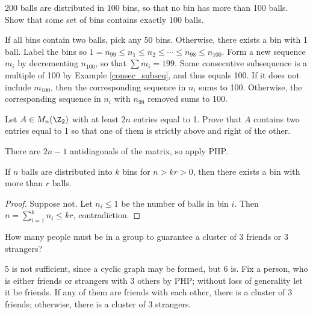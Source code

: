 \documentclass[a4paper]{article}
\begin{document}
\begin{example}
200 balls are distributed in 100 bins, so that no bin has more than 100 balls. Show that some set of bins contains exactly 100 balls.

\begin{hl}
If all bins contain two balls, pick any 50 bins. Otherwise, there exists a bin with 1 ball. Label the bins so $1=n_{99}\leq n_1\leq n_2\leq\cdots\leq n_{98}\leq n_{100}$. Form a new sequence $m_i$ by decrementing $n_{100}$, so that $\sum m_i=199$. Some consecutive subsequence is a multiple of 100 by Example \ref{consec_subseq}, and thus equals 100. If it does not include $m_{100}$, then the corresponding sequence in $n_i$ sums to 100. Otherwise, the corresponding sequence in $n_i$ with $n_{99}$ removed sums to 100.
\end{hl}
\end{example}

\begin{example}
Let $A\in M_n(\Z_2)$ with at least $2n$ entries equal to 1. Prove that $A$ contains two entries equal to 1 so that one of them is strictly above and right of the other.

\begin{hl}
There are $2n-1$ antidiagonals of the matrix, so apply PHP.
\end{hl}
\end{example}

\begin{theorem}
If $n$ balls are distributed into $k$ bins for $n>kr>0$, then there exists a bin with more than $r$ balls.

\begin{hl}
\begin{proof}
Suppose not. Let $n_i\leq1$ be the number of balls in bin $i$. Then $n=\sum_{i=1}^kn_i\leq kr$, contradiction.
\end{proof}
\end{hl}
\end{theorem}

\begin{example}
How many people must be in a group to guarantee a cluster of 3 friends or 3 strangers?

\begin{hl}
5 is not sufficient, since a cyclic graph may be formed, but 6 is. Fix a person, who is either friends or strangers with 3 others by PHP; without loss of generality let it be friends. If any of them are friends with each other, there is a cluster of 3 friends; otherwise, there is a cluster of 3 strangers.
\end{hl}
\end{example}
\end{document}
